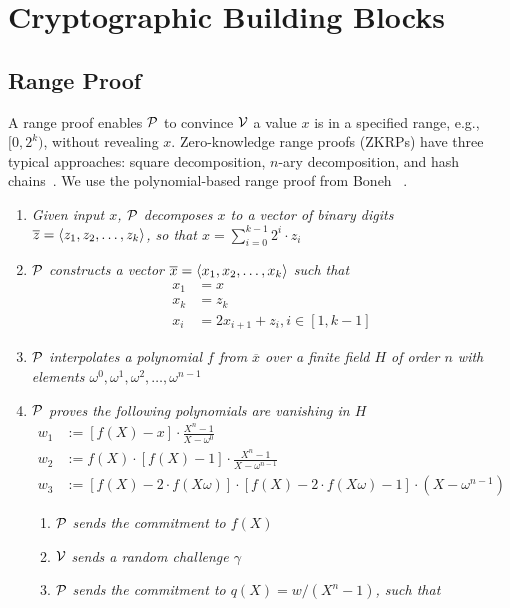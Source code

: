 \chapter{Cryptographic Building Blocks}

\section{Range Proof}
\label{sec:range}

A range proof enables $\mathcal{P}$ to convince $\mathcal{V}$ a value $x$ is in a specified range, e.g., $[0,2^k)$, without revealing $x$. Zero-knowledge range proofs (ZKRPs) have three typical approaches: square decomposition, $n$-ary decomposition, and hash chains~\cite{zkrp}. We use the polynomial-based range proof from Boneh \etal~\cite{rangeproof}.
\begin{enumerate}
    \item \textit{Given input $x$, $\mathcal{P}$ decomposes $x$ to a vector of binary digits $\overline{z}=\left \langle z_1,z_2,\dots,z_k \right \rangle$, so that $x=\sum_{i=0}^{k-1}2^i\cdot{z_i}$} 
    \item \textit{$\mathcal{P}$ constructs a vector $\overline{x}=\left \langle x_1,x_2,\dots,x_k \right \rangle$ such that}
    \begin{align*}
        x_1&=x \\
        x_k&=z_k \\
        x_i&=2x_{i+1}+z_i,i\in[1,k-1]
    \end{align*}
    \item \textit{$\mathcal{P}$ interpolates a polynomial $f$ from $\overline{x}$ over a finite field $H$ of order $n$ with elements $\omega^0,\omega^1,\omega^2,\ldots,\omega^{n-1}$} 
    \item \textit{$\mathcal{P}$ proves the following polynomials are vanishing in $H$}
    \begin{align*}
        w_1&:=[f(X)-x]\cdot\frac{X^n-1}{X-\omega^0} \\
        w_2&:=f(X)\cdot[f(X)-1]\cdot\frac{X^n-1}{X-\omega^{n-1}} \\
        w_3&:=[f(X)-2\cdot{f(X\omega)}]\cdot[f(X)-2\cdot{f(X\omega)}-1]\cdot(X-\omega^{n-1})
    \end{align*}
    \begin{enumerate}
        \item $\mathcal{P}$ \textit{sends the commitment to $f(X)$}
        \item $\mathcal{V}$ \textit{sends a random challenge $\gamma$}
        \item $\mathcal{P}$ \textit{sends the commitment to $q(X)=w/(X^n-1)$, such that}

\end{enumerate}
\end{enumerate}

